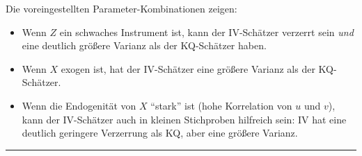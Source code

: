 \documentclass[
  a4paper,
  DIV=11,
  oneside]{scrreprt}
\newenvironment{Shaded}{\begin{snugshade}}{\end{snugshade}}
\newcommand{\AttributeTok}[1]{\textcolor[rgb]{0.40,0.45,0.13}{#1}}
\newcommand{\CommentTok}[1]{\textcolor[rgb]{0.37,0.37,0.37}{#1}}
\newcommand{\DecValTok}[1]{\textcolor[rgb]{0.68,0.00,0.00}{#1}}
\newcommand{\FloatTok}[1]{\textcolor[rgb]{0.68,0.00,0.00}{#1}}
\newcommand{\FunctionTok}[1]{\textcolor[rgb]{0.28,0.35,0.67}{#1}}
\newcommand{\NormalTok}[1]{\textcolor[rgb]{0.00,0.23,0.31}{#1}}
\newcommand{\OtherTok}[1]{\textcolor[rgb]{0.00,0.23,0.31}{#1}}
\newcommand{\SpecialCharTok}[1]{\textcolor[rgb]{0.37,0.37,0.37}{#1}}
\newcommand{\StringTok}[1]{\textcolor[rgb]{0.13,0.47,0.30}{#1}}
\providecommand{\tightlist}{%
  \setlength{\itemsep}{0pt}\setlength{\parskip}{0pt}}\usepackage{longtable,booktabs,array}
\begin{document}
Die voreingestellten Parameter-Kombinationen zeigen:

\begin{itemize}
\tightlist
\item
  Wenn \(Z\) ein schwaches Instrument ist, kann der IV-Schätzer verzerrt
  sein \emph{und} eine deutlich größere Varianz als der KQ-Schätzer
  haben.
\item
  Wenn \(X\) exogen ist, hat der IV-Schätzer eine größere Varianz als
  der KQ-Schätzer.
\item
  Wenn die Endogenität von \(X\) ``stark'' ist (hohe Korrelation von
  \(u\) und \(v\)), kann der IV-Schätzer auch in kleinen Stichproben
  hilfreich sein: IV hat eine deutlich geringere Verzerrung als KQ, aber
  eine größere Varianz.
\end{itemize}

\begin{center}\rule{0.5\linewidth}{0.5pt}\end{center}

\begin{Shaded}
\end{Shaded}
\end{document}

